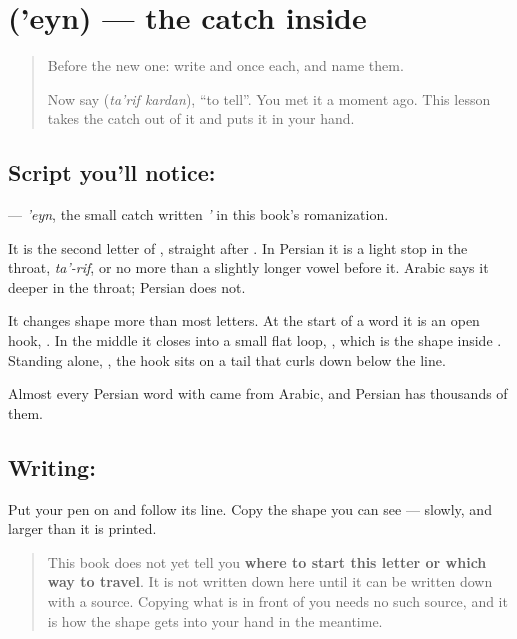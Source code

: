 \section[\texorpdfstring{\fa{ع} ('eyn)}{ع ('eyn)}]{ ('eyn) — the catch inside }

\label{lesson:FA-W291-eyn}



\begin{quote}
Before the new one: write  and  once each, and name them.

Now say \textbf{ } (\emph{ta'rif kardan}), \textquotedblleft{}to tell\textquotedblright{}. You met it a moment ago. This lesson takes the catch out of it and puts it in your hand.
\end{quote}

\subsection*{Script you'll notice: }
\textbf{} — \emph{'eyn}, the small catch written \emph{'} in this book's romanization.

It is the second letter of \textbf{}, straight after \textbf{}. In Persian it is a light stop in the throat, \emph{ta'-rif}, or no more than a slightly longer vowel before it. Arabic says it deeper in the throat; Persian does not.

It changes shape more than most letters. At the start of a word it is an open hook, \textbf{}. In the middle it closes into a small flat loop, \textbf{}, which is the shape inside \textbf{}. Standing alone, \textbf{}, the hook sits on a tail that curls down below the line.

Almost every Persian word with \textbf{} came from Arabic, and Persian has thousands of them.

\subsection*{Writing: }
Put your pen on  and follow its line. Copy the shape you can see — slowly, and larger than it is printed.

\begin{quote}
This book does not yet tell you \textbf{where to start this letter or which way to travel}. It is not written down here until it can be written down with a source. Copying what is in front of you needs no such source, and it is how the shape gets into your hand in the meantime.
\end{quote}

